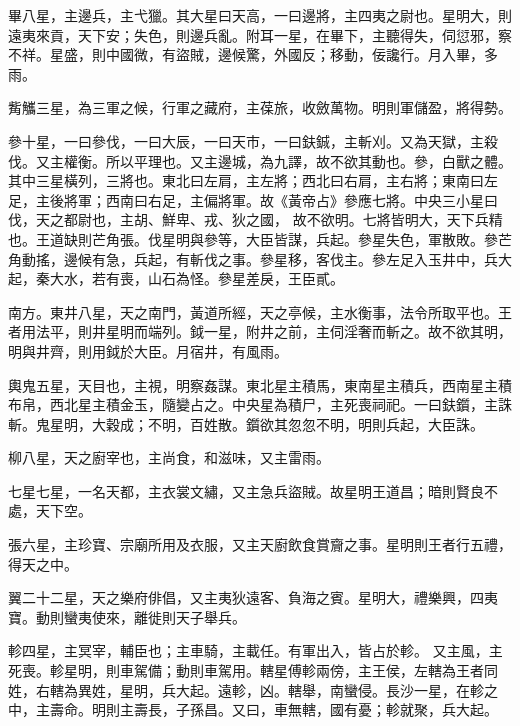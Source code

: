 \begin{pinyinscope}
{{ 畢八星，主邊兵，主弋獵。其大星曰天高，一曰邊將，主四夷之尉也。星明大，則
 遠夷來貢，天下安；失色，則邊兵亂。附耳一星，在畢下，主聽得失，伺愆邪，察不祥。星盛，則中國微，有盜賊，邊候驚，外國反；移動，佞讒行。月入畢，多雨。



 觜觿三星，為三軍之候，行軍之藏府，主葆旅，收斂萬物。明則軍儲盈，將得勢。



 參十星，一曰參伐，一曰大辰，一曰天市，一曰鈇鋮，主斬刈。又為天獄，主殺伐。又主權衡。所以平理也。又主邊城，為九譯，故不欲其動也。參，白獸之體。其中三星橫列，三將也。東北曰左肩，主左將；西北曰右肩，主右將；東南曰左足，主後將軍；西南曰右足，主偏將軍。故《黃帝占》參應七將。中央三小星曰伐，天之都尉也，主胡、鮮卑、戎、狄之國，
 故不欲明。七將皆明大，天下兵精也。王道缺則芒角張。伐星明與參等，大臣皆謀，兵起。參星失色，軍散敗。參芒角動搖，邊候有急，兵起，有斬伐之事。參星移，客伐主。參左足入玉井中，兵大起，秦大水，若有喪，山石為怪。參星差戾，王臣貳。



 南方。東井八星，天之南門，黃道所經，天之亭候，主水衡事，法令所取平也。王者用法平，則井星明而端列。鉞一星，附井之前，主伺淫奢而斬之。故不欲其明，明與井齊，則用鉞於大臣。月宿井，有風雨。



 輿鬼五星，天目也，主視，明察姦謀。東北星主積馬，東南星主積兵，西南星主積
 布帛，西北星主積金玉，隨變占之。中央星為積尸，主死喪祠祀。一曰鈇鑕，主誅斬。鬼星明，大穀成；不明，百姓散。鑕欲其忽忽不明，明則兵起，大臣誅。



 柳八星，天之廚宰也，主尚食，和滋味，又主雷雨。



 七星七星，一名天都，主衣裳文繡，又主急兵盜賊。故星明王道昌；暗則賢良不處，天下空。



 張六星，主珍寶、宗廟所用及衣服，又主天廚飲食賞齎之事。星明則王者行五禮，得天之中。



 翼二十二星，天之樂府俳倡，又主夷狄遠客、負海之賓。星明大，禮樂興，四夷寶。動則蠻夷使來，離徙則天子舉兵。



 軫四星，主冥宰，輔臣也；主車騎，主載任。有軍出入，皆占於軫。
 又主風，主死喪。軫星明，則車駕備；動則車駕用。轄星傅軫兩傍，主王侯，左轄為王者同姓，右轄為異姓，星明，兵大起。遠軫，凶。轄舉，南蠻侵。長沙一星，在軫之中，主壽命。明則主壽長，子孫昌。又曰，車無轄，國有憂；軫就聚，兵大起。



}}
\end{pinyinscope}
